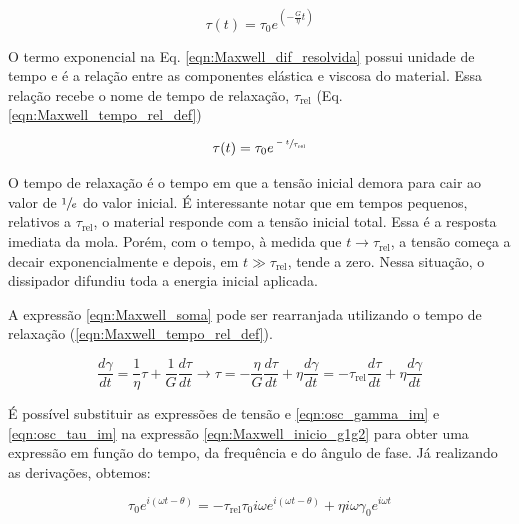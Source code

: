 			\begin{equation}
				\tau(t) = \tau_0 e^{\left( -\frac{G}{\eta}t \right)}
				\label{eqn:Maxwell_dif_resolvida}
			\end{equation}
			
			O termo exponencial na Eq. \ref{eqn:Maxwell_dif_resolvida} possui unidade de tempo e é a relação entre as componentes elástica e viscosa do material. Essa relação recebe o nome de tempo de relaxação, \(\tau_{\textrm{rel}}\) (Eq. \ref{eqn:Maxwell_tempo_rel_def})
			
			\begin{equation}
				\tau(t) = \tau_0 e^{\sfrac{-t}{\tau_{\textrm{rel}}}}
				\label{eqn:Maxwell_tempo_rel_def}
			\end{equation}
		
			O tempo de relaxação é o tempo em que a tensão inicial demora para cair ao valor de \(\sfrac{1}{e}\) do valor inicial. É interessante notar que em tempos pequenos, relativos a \(\tau_{\textrm{rel}}\), o material responde com a tensão inicial total. Essa é a resposta imediata da mola. Porém, com o tempo, à medida que \(t\to\tau_{\textrm{rel}}\), a tensão começa a decair exponencialmente e depois, em \(t \gg \tau_{\textrm{rel}}\), tende a zero. Nessa situação, o dissipador difundiu toda a energia inicial aplicada.
			
			A expressão \ref{eqn:Maxwell_soma} pode ser rearranjada utilizando o tempo de relaxação (\ref{eqn:Maxwell_tempo_rel_def}).
			
			\begin{equation}
				\dfrac{d\gamma}{dt} = \dfrac{1}{\eta}\tau + \dfrac{1}{G}\dfrac{d\tau}{dt} \to 
				\tau = -\dfrac{\eta}{G} \dfrac{d\tau}{dt} + \eta\dfrac{d\gamma}{dt} =
				-\tau_{\textrm{rel}} \dfrac{d\tau}{dt} + \eta\dfrac{d\gamma}{dt}
				\label{eqn:Maxwell_inicio_g1g2}
			\end{equation}
			
			É possível substituir as expressões de tensão e \ref{eqn:osc_gamma_im} e \ref{eqn:osc_tau_im} na expressão \ref{eqn:Maxwell_inicio_g1g2} para obter uma expressão em função do tempo, da frequência e do ângulo de fase. Já realizando as derivações, obtemos:
			
			\begin{equation}
				\tau_0 e^{i \left( \omega t - \theta \right)} = - \tau_{\textrm{rel}} \tau_0 i\omega e^{i \left( \omega t - \theta \right)}     +       \eta i\omega\gamma_0e^{i\omega t}
				\label{eqn:Maxwell_substituicao}
			\end{equation}
			
